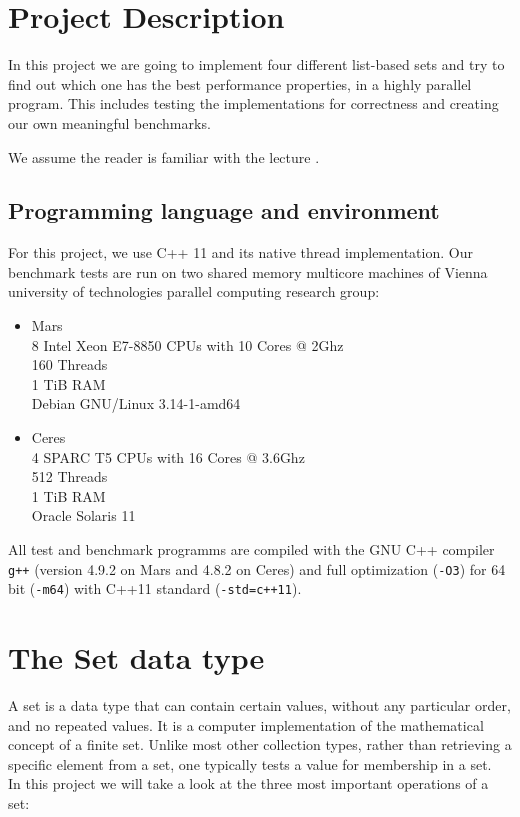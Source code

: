 \section{Project Description}

In this project we are going to implement four different list-based sets and try to find out which one has the best performance properties, in a highly parallel program. This includes testing the implementations for correctness and creating our own meaningful benchmarks. 

We assume the reader is familiar with the lecture \cite{traeffSlides}.

\subsection{Programming language and environment}
For this project, we use C++ 11 and its native thread implementation.
Our benchmark tests are run on two shared memory multicore machines of Vienna university of technologies parallel computing research group:

\begin{itemize}
  \item Mars\\
  8 Intel Xeon E7-8850 CPUs with 10 Cores @ 2Ghz\\
  160 Threads\\
  1 TiB RAM\\
  Debian GNU/Linux 3.14-1-amd64
  \item Ceres\\
  4 SPARC T5 CPUs with 16 Cores @ 3.6Ghz\\
  512 Threads\\
  1 TiB RAM\\
  Oracle Solaris 11
\end{itemize}
All test and benchmark programms are compiled with the GNU C++ compiler \texttt{g++} (version 4.9.2 on Mars and 4.8.2 on Ceres) and full optimization (\texttt{-O3}) for 64 bit (\texttt{-m64}) with C++11 standard (\texttt{-std=c++11}).

\section{The Set data type} 
A set is a data type that can contain certain values, without any particular order, and no repeated values. It is a computer implementation of the mathematical concept of a finite set. Unlike most other collection types, rather than retrieving a specific element from a set, one typically tests a value for membership in a set. \cite{journals/ipl/Hehner81}\\
In this project we will take a look at the three most important operations of a set:

